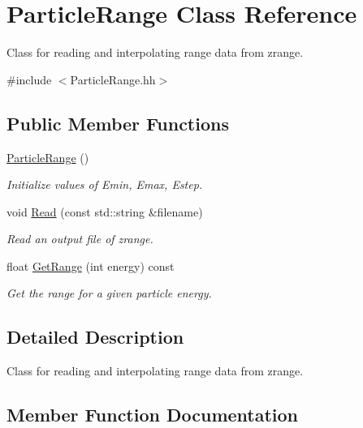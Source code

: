 \hypertarget{class_particle_range}{}\section{Particle\+Range Class Reference}
\label{class_particle_range}


Class for reading and interpolating range data from \textquotesingle{}zrange\textquotesingle{}.  




{\ttfamily \#include $<$Particle\+Range.\+hh$>$}

\subsection*{Public Member Functions}
\begin{DoxyCompactItemize}
\item 
\mbox{\label{class_particle_range_a4273029166d7a6220bfd1728b6c18f69}} 
\hyperlink{class_particle_range_a4273029166d7a6220bfd1728b6c18f69}{Particle\+Range} ()
\begin{DoxyCompactList}\small\item\em Initialize values of Emin, Emax, Estep. \end{DoxyCompactList}\item 
void \hyperlink{class_particle_range_ac1e0da5aca629369e93caf8e883da624}{Read} (const std\+::string \&filename)
\begin{DoxyCompactList}\small\item\em Read an output file of zrange. \end{DoxyCompactList}\item 
float \hyperlink{class_particle_range_a433dead3f85fe19ee1675934b65acf3f}{Get\+Range} (int energy) const
\begin{DoxyCompactList}\small\item\em Get the range for a given particle energy. \end{DoxyCompactList}\end{DoxyCompactItemize}


\subsection{Detailed Description}
Class for reading and interpolating range data from \textquotesingle{}zrange\textquotesingle{}. 

\subsection{Member Function Documentation}
\mbox{\label{class_particle_range_a433dead3f85fe19ee1675934b65acf3f}} 
